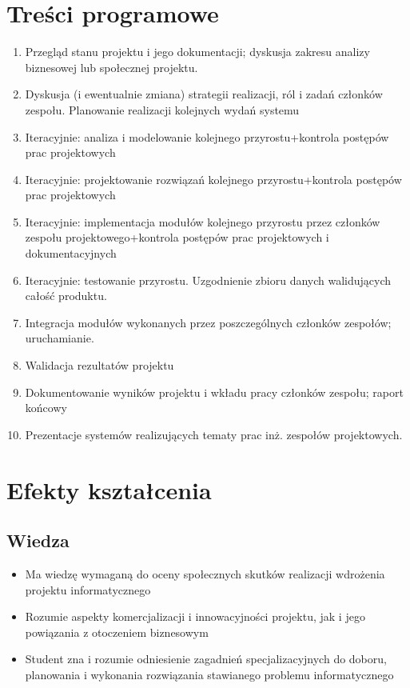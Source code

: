 \documentclass[12pt, a4paper]{article}
\begin{document}
\section{Treści programowe}

\begin{enumerate}
  \item Przegląd stanu projektu i jego dokumentacji; dyskusja zakresu analizy biznesowej lub społecznej projektu.
  \item Dyskusja (i ewentualnie zmiana) strategii realizacji, ról i zadań członków zespołu. Planowanie realizacji kolejnych wydań systemu
  \item Iteracyjnie: analiza i modelowanie kolejnego przyrostu+kontrola postępów prac projektowych
  \item Iteracyjnie: projektowanie rozwiązań kolejnego przyrostu+kontrola postępów prac projektowych
  \item Iteracyjnie: implementacja modułów kolejnego przyrostu przez członków zespołu projektowego+kontrola postępów prac projektowych i dokumentacyjnych
  \item Iteracyjnie: testowanie przyrostu. Uzgodnienie zbioru danych walidujących całość produktu.
  \item Integracja modułów wykonanych przez poszczególnych członków zespołów; uruchamianie.
  \item Walidacja rezultatów projektu
  \item Dokumentowanie wyników projektu i wkładu pracy członków zespołu; raport końcowy
  \item Prezentacje systemów realizujących tematy prac inż. zespołów projektowych.
\end{enumerate}

\section{Efekty kształcenia}

\subsection*{Wiedza}
\begin{itemize}
  \item Ma wiedzę wymaganą do oceny społecznych skutków realizacji wdrożenia projektu informatycznego
  \item Rozumie aspekty komercjalizacji i innowacyjności projektu, jak i jego powiązania z otoczeniem biznesowym
  \item Student zna i rozumie odniesienie zagadnień specjalizacyjnych do doboru, planowania i wykonania rozwiązania stawianego problemu informatycznego
\end{itemize}
\end{document}
